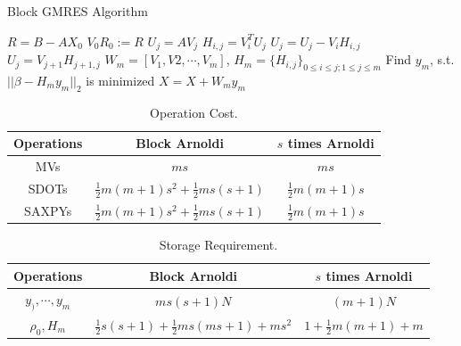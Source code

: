 \begin{algorithm}[htbp]{}
	\caption{Block GMRES Algorithm}   
	\label{alg:block gmres}   
	\begin{algorithmic}[1]
		\State $R = B - AX_0$
		\State $V_0R_0 := R$ 
		\State $U_j = AV_{j}$  
		\State $H_{i,j} = V_i^T U_j$ 
		\State $U_j = U_j - V_iH_{i,j}$ 
		\EndFor
		\State $U_j = V_{j+1}H_{j+1,j}$  
		\EndFor
		\State $W_m = [V_1, V2, \cdots, V_m]$, $H_m = \{H_{i,j}\}_{0 \leq i \leq j; 1 \leq j \leq m}$ 
		\State Find $y_m$, s.t. $||\beta - H_my_m||_2$ is minimized
		\State $X = X + W_my_m$
		\EndFunction
	\end{algorithmic}  
\end{algorithm}

\begin{table}[htbp]
	\renewcommand{\arraystretch}{1.4}
	\small	
	\caption{Operation Cost.}
	\label{block-arnoldi}
	\centering
	\begin{tabular}{c|c|c}
		\toprule
		Operations & Block Arnoldi & $s$ times Arnoldi  \\
		\midrule
		MVs  & $ms$ & $ms$ \\
		SDOTs & $\frac{1}{2}m(m+1)s^2+\frac{1}{2}ms(s+1)$ & $\frac{1}{2}m(m+1)s$   \\
		SAXPYs & $\frac{1}{2}m(m+1)s^2+\frac{1}{2}ms(s+1)$ & $\frac{1}{2}m(m+1)s$ \\
		\bottomrule
	\end{tabular}
\end{table}

\begin{table}[htbp]
	\renewcommand{\arraystretch}{1.4}
	\small	
	\caption{Storage Requirement.}
	\label{block-arnoldi-memory}
	\centering
	\begin{tabular}{c|c|c}
		\toprule
		Operations & Block Arnoldi & $s$ times Arnoldi  \\
		\midrule
		$y_),\cdots,  y_m$ & $ms(s+1)N$ & $(m+1)N$   \\
		$\rho_0,H_m$ & $\frac{1}{2}s(s+1)+\frac{1}{2}ms(ms+1)+ms^2$ & $1+\frac{1}{2}m(m+1)+m$ \\
		\bottomrule
	\end{tabular}
\end{table}



